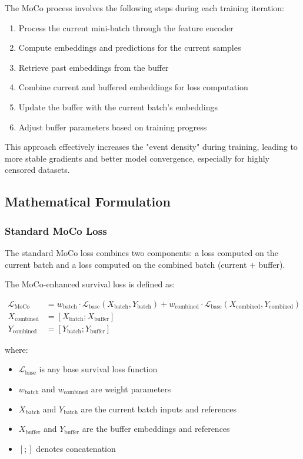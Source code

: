 The MoCo process involves the following steps during each training iteration:
\begin{enumerate}
\item Process the current mini-batch through the feature encoder
\item Compute embeddings and predictions for the current samples
\item Retrieve past embeddings from the buffer
\item Combine current and buffered embeddings for loss computation
\item Update the buffer with the current batch's embeddings
\item Adjust buffer parameters based on training progress
\end{enumerate}

This approach effectively increases the "event density" during training, leading to more stable gradients and better model convergence, especially for highly censored datasets.

\subsection{Mathematical Formulation}

\subsubsection{Standard MoCo Loss}

The standard MoCo loss combines two components: a loss computed on the current batch and a loss computed on the combined batch (current + buffer).

\begin{equationbox}[title=Standard MoCo Survival Loss]
  The MoCo-enhanced survival loss is defined as:
  
  \begin{align}
    \mathcal{L}_{\text{MoCo}} &= w_{\text{batch}} \cdot \mathcal{L}_{\text{base}}(X_{\text{batch}}, Y_{\text{batch}}) + w_{\text{combined}} \cdot \mathcal{L}_{\text{base}}(X_{\text{combined}}, Y_{\text{combined}})\\
    X_{\text{combined}} &= [X_{\text{batch}}; X_{\text{buffer}}]\\
    Y_{\text{combined}} &= [Y_{\text{batch}}; Y_{\text{buffer}}]
  \end{align}
  
  where:
  \begin{itemize}
  \item $\mathcal{L}_{\text{base}}$ is any base survival loss function
  \item $w_{\text{batch}}$ and $w_{\text{combined}}$ are weight parameters
  \item $X_{\text{batch}}$ and $Y_{\text{batch}}$ are the current batch inputs and references
  \item $X_{\text{buffer}}$ and $Y_{\text{buffer}}$ are the buffer embeddings and references
  \item $[;]$ denotes concatenation
  \end{itemize}
\end{equationbox}

